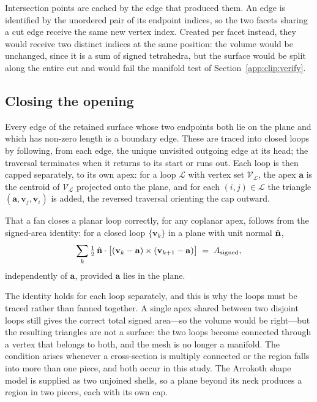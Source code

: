 Intersection points are cached by the edge that produced them. An edge is
identified by the unordered pair of its endpoint indices, so the two facets
sharing a cut edge receive the same new vertex index. Created per facet
instead, they would receive two distinct indices at the same position: the
volume would be unchanged, since it is a sum of signed tetrahedra, but the
surface would be split along the entire cut and would fail the manifold test of
Section~\ref{app:clip:verify}.

\subsection{Closing the opening}
\label{app:clip:cap}

Every edge of the retained surface whose two endpoints both lie on the plane
and which has non-zero length is a boundary edge. These are traced into closed
loops by following, from each edge, the unique unvisited outgoing edge at its
head; the traversal terminates when it returns to its start or runs out. Each
loop is then capped separately, to its own apex: for a loop $\mathcal{L}$ with
vertex set $\mathcal{V}_\mathcal{L}$, the apex $\mathbf{a}$ is the centroid of
$\mathcal{V}_\mathcal{L}$ projected onto the plane, and for each
$(i,j) \in \mathcal{L}$ the triangle $(\mathbf{a}, \mathbf{v}_j, \mathbf{v}_i)$
is added, the reversed traversal orienting the cap outward.

That a fan closes a planar loop correctly, for any coplanar apex, follows from
the signed-area identity: for a closed loop $\{\mathbf{v}_k\}$ in a plane with
unit normal $\hat{\mathbf{n}}$,
\begin{equation}
\sum_k \tfrac{1}{2}\,\hat{\mathbf{n}} \cdot
\big[(\mathbf{v}_k - \mathbf{a}) \times (\mathbf{v}_{k+1} - \mathbf{a})\big]
\;=\; A_{\mathrm{signed}},
\label{eq:appfan}
\end{equation}
independently of $\mathbf{a}$, provided $\mathbf{a}$ lies in the plane.

The identity holds for each loop separately, and this is why the loops must be
traced rather than fanned together. A single apex shared between two disjoint
loops still gives the correct total signed area---so the volume would be
right---but the resulting triangles are not a surface: the two loops become
connected through a vertex that belongs to both, and the mesh is no longer a
manifold. The condition arises whenever a cross-section is multiply connected
or the region falls into more than one piece, and both occur in this study. The
Arrokoth shape model is supplied as two unjoined shells, so a plane beyond its
neck produces a region in two pieces, each with its own cap.

